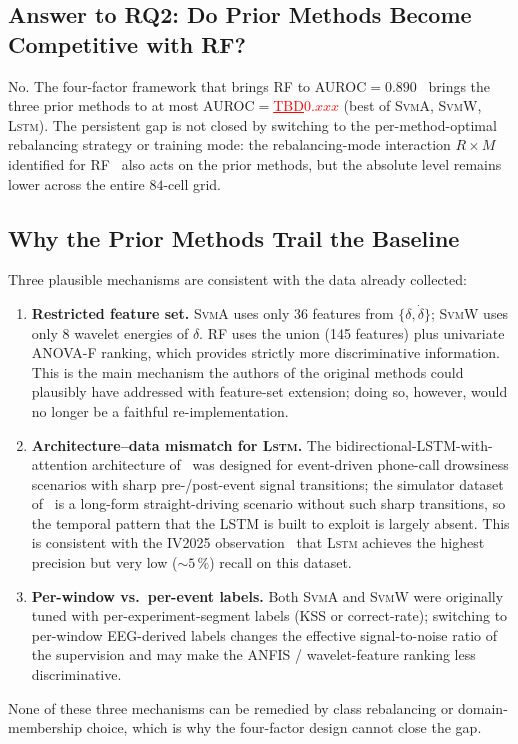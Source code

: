 \documentclass[lettersize,journal]{IEEEtran}
\newcommand{\Impl}[1]{\textsc{#1}}
\newcommand{\TBD}[1]{\textcolor{red}{\underline{TBD#1}}}
\begin{document}
\subsection{Answer to RQ2: Do Prior Methods Become Competitive with RF?}\label{sec:rq2}
No.
The four-factor framework that brings \Impl{RF} to AUROC$=0.890$~\cite{nakagama2025factorial} brings the three prior methods to at most AUROC$=$\TBD{$0.\textit{xxx}$} (best of \Impl{SvmA}, \Impl{SvmW}, \Impl{Lstm}).
The persistent gap is not closed by switching to the per-method-optimal rebalancing strategy or training mode: the rebalancing-mode interaction $R \times M$ identified for \Impl{RF}~\cite{nakagama2025factorial} also acts on the prior methods, but the absolute level remains lower across the entire $84$-cell grid.

\subsection{Why the Prior Methods Trail the Baseline}\label{sec:why_trail}
Three plausible mechanisms are consistent with the data already collected:
\begin{enumerate}
\item \textbf{Restricted feature set.}
\Impl{SvmA} uses only 36 features from $\{\delta, \dot{\delta}\}$; \Impl{SvmW} uses only 8 wavelet energies of $\delta$.
\Impl{RF} uses the union (145 features) plus univariate ANOVA-F ranking, which provides strictly more discriminative information.
This is the main mechanism the authors of the original methods could plausibly have addressed with feature-set extension; doing so, however, would no longer be a faithful re-implementation.

\item \textbf{Architecture--data mismatch for \Impl{Lstm}.}
The bidirectional-LSTM-with-attention architecture of~\cite{wang2022} was designed for event-driven phone-call drowsiness scenarios with sharp pre-/post-event signal transitions; the simulator dataset of~\cite{aygun2024} is a long-form straight-driving scenario without such sharp transitions, so the temporal pattern that the LSTM is built to exploit is largely absent. This is consistent with the IV2025 observation~\cite{nakagama2025iv} that \Impl{Lstm} achieves the highest precision but very low ($\sim 5\,\%$) recall on this dataset.

\item \textbf{Per-window vs.\ per-event labels.}
Both \Impl{SvmA} and \Impl{SvmW} were originally tuned with per-experiment-segment labels (KSS or correct-rate); switching to per-window EEG-derived labels changes the effective signal-to-noise ratio of the supervision and may make the ANFIS / wavelet-feature ranking less discriminative.
\end{enumerate}
None of these three mechanisms can be remedied by class rebalancing or domain-membership choice, which is why the four-factor design cannot close the gap.
\end{document}
